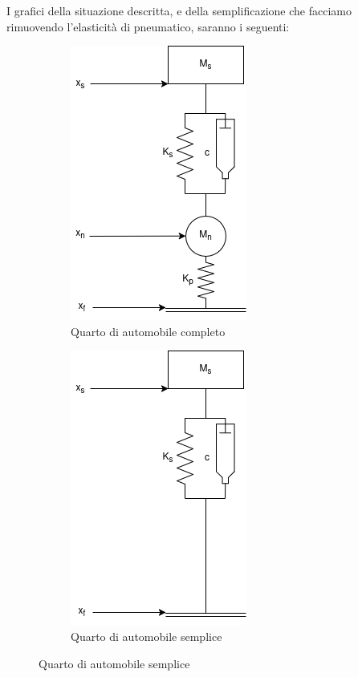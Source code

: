 \documentclass[a4paper,11pt]{article}
\begin{document}
\noindent
\begin{minipage}{\textwidth}
I grafici della situazione descritta, e della semplificazione che facciamo rimuovendo l'elasticità di pneumatico, saranno i seguenti: 

\begin{figure}[H]
    \centering
    \begin{subfigure}{0.45\textwidth}
        \centering
        \includegraphics[scale=0.6]{../figures/suspension_complex.png}
        \caption{Quarto di automobile completo}
        \label{fig:image1}
    \end{subfigure}
    \hfill
    \begin{subfigure}{0.45\textwidth}
        \centering
        \includegraphics[scale=0.6]{../figures/suspension_simple.png}
        \caption{Quarto di automobile semplice}
        \label{fig:image2}
    \end{subfigure}
\end{figure}
\end{minipage}
\end{document}
